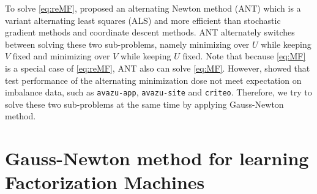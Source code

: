 \documentclass[11pt,twoside]{article}
\newcommand{\bsym}[1]{\ensuremath{\boldsymbol{#1}}}
\newcommand{\bw}{\ensuremath{\bsym{w}}}
\newcommand{\bj}{\ensuremath{\bsym{j}}}
\newcommand{\bp}{\ensuremath{\bsym{p}}}
\newcommand{\bq}{\ensuremath{\bsym{q}}}
\newcommand{\bh}{\ensuremath{\bsym{h}}}
\DeclareMathOperator*{\vectorize}{vec}
\begin{document}
To solve \eqref{eq:reMF}, \citet{test17a} proposed an alternating Newton method (ANT) which is a variant alternating least squares (ALS) and more efficient than stochastic gradient methods and coordinate descent methods. ANT alternately switches between solving these two sub-problems, namely minimizing over $U$ while keeping $V$ fixed and minimizing over $V$ while keeping $U$ fixed. Note that because \eqref{eq:MF} is a special case of \eqref{eq:reMF}, ANT also can solve \eqref{eq:MF}.
However, \citet{test17a} showed that test performance of the alternating minimization dose not meet expectation on imbalance data, such as {\tt avazu-app}, {\tt avazu-site} and {\tt criteo}. Therefore, we try to solve these two sub-problems at the same time by applying Gauss-Newton method.

\section{Gauss-Newton method for learning Factorization Machines}

\end{document}
